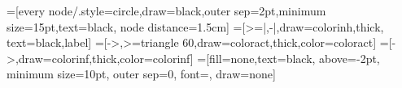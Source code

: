 
\newcommand{\GRN}{\mathcal{GRN}}
\newcommand{\IG}{\mathcal{G}}
\newcommand{\GRNreg}[1]{\PHpredecgene{#1}}

\def\levels{\mathsf{levels}}
\def\levelsA#1#2{\levels_+(#1\rightarrow #2)}
\def\levelsI#1#2{\levels_-(#1\rightarrow #2)}
\newcommand{\PHres}{\mathsf{Res}}

\newcommand{\Kinconnu}{\emptyset}
\newcommand{\RRGva}[3]{#1 \stackrel{#2}{\longrightarrow} #3}
\newcommand{\RRGgi}{\mathcal{G}}
\newcommand{\RRGreg}[1]{\RRGgi_{#1}}
\newcommand{\RRGres}[2]{\PHres_{#1}(#2)}








=[every node/.style={circle,draw=black,outer sep=2pt,minimum
                size=15pt,text=black}, node distance=1.5cm]
=[>=|,-|,draw=colorinh,thick, text=black,label]
=[->,>=triangle 60,draw=coloract,thick,color=coloract]
=[->,draw=colorinf,thick,color=colorinf]
=[fill=none,text=black, above=-2pt,%
minimum size=10pt, outer sep=0, font=\scriptsize, draw=none]

